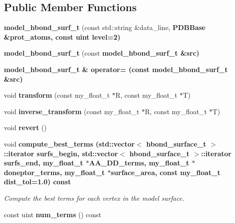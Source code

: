 \subsection*{Public Member Functions}
\begin{CompactItemize}
\item 
\textbf{model\_\-hbond\_\-surf\_\-t} (const std::string \&data\_\-line, \bf{PDBBase} \&prot\_\-atoms, const uint level=2)\label{classSimSite3D_1_1model__hbond__surf__t_cb646a3dbc03f4990450144a918753a8}

\item 
\textbf{model\_\-hbond\_\-surf\_\-t} (const \bf{model\_\-hbond\_\-surf\_\-t} \&src)\label{classSimSite3D_1_1model__hbond__surf__t_c6978b9984df3bdd11e5b492600468c2}

\item 
\bf{model\_\-hbond\_\-surf\_\-t} \& \textbf{operator=} (const \bf{model\_\-hbond\_\-surf\_\-t} \&src)\label{classSimSite3D_1_1model__hbond__surf__t_01930d6fccfbfb3c509b686060699606}

\item 
void \textbf{transform} (const my\_\-float\_\-t $\ast$R, const my\_\-float\_\-t $\ast$T)\label{classSimSite3D_1_1model__hbond__surf__t_65d5a73c0ffcbada1c8496c81a43929a}

\item 
void \textbf{inverse\_\-transform} (const my\_\-float\_\-t $\ast$R, const my\_\-float\_\-t $\ast$T)\label{classSimSite3D_1_1model__hbond__surf__t_b0ebe991b54fb1b3247a4a716a0673d4}

\item 
void \textbf{revert} ()\label{classSimSite3D_1_1model__hbond__surf__t_da904de58db5258030d9144908f915c6}

\item 
void \bf{compute\_\-best\_\-terms} (std::vector$<$ \bf{hbond\_\-surface\_\-t} $>$::iterator surfs\_\-begin, std::vector$<$ \bf{hbond\_\-surface\_\-t} $>$::iterator surfs\_\-end, my\_\-float\_\-t $\ast$AA\_\-DD\_\-terms, my\_\-float\_\-t $\ast$doneptor\_\-terms, my\_\-float\_\-t $\ast$surface\_\-area, const my\_\-float\_\-t dist\_\-tol=1.0) const 
\begin{CompactList}\small\item\em Compute the best terms for each vertex in the model surface. \item\end{CompactList}\item 
const uint \textbf{num\_\-terms} () const \label{classSimSite3D_1_1model__hbond__surf__t_d29013b948a3de1594b72640d8f54aa0}


\end{CompactItemize}
